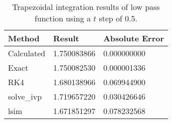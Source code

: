 \begin{singlespace}
\begin{table}[H]
	\centering
	\begin{tabular}{@{} l l l  @{}} 	
		\toprule %
		\footnotesize %
		\raggedright %
		Method	&		Result & Absolute Error		\\
		\midrule		
%
Calculated& 	1.750083866&	0.000000000\\
Exact& 	1.750082530&	0.000001336\\
RK4&	1.680138966&	0.069944900\\
solve\_ivp& 	1.719657220	&0.030426646\\
lsim&	1.671851297&	0.078232568\\
%
		\bottomrule
	\end{tabular}
	\caption{Trapezoidal integration results of low pass function using a $t$ step of 0.5.}
	\label{tab: trap lowpass res}
\end{table}
\end{singlespace}
	
	